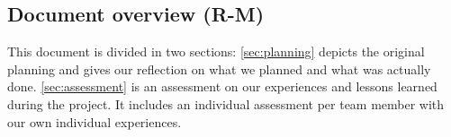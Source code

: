
\subsection{Document overview (R-M)}
This document is divided in two sections:
\autoref{sec:planning} depicts the original planning and gives our reflection on what we planned and what was actually done.
\autoref{sec:assessment} is an assessment on our experiences and lessons learned during the project.
It includes an individual assessment per team member with our own individual experiences.